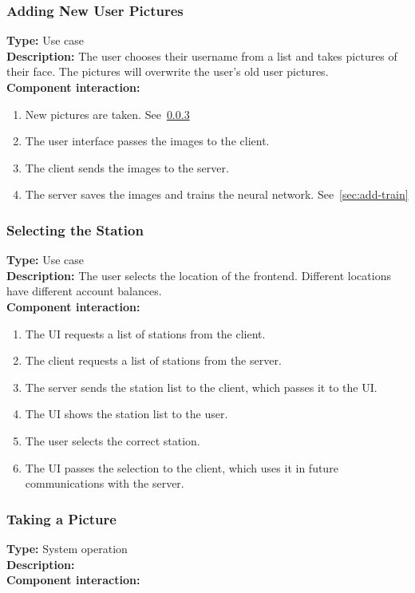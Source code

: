 \documentclass[11pt]{article}
\begin{document}
\subsubsection{Adding New User Pictures}
\textbf{Type:} Use case\\
\textbf{Description:} The user chooses their username from a list and takes pictures of their face. 
The pictures will overwrite the user's old user pictures.\\
\textbf{Component interaction:}
\begin{enumerate} 
\item{New pictures are taken. See~\ref{sec:pic}}
\item{The user interface passes the images to the client.}
\item{The client sends the images to the server.}
\item{The server saves the images and trains the neural network. See~\ref{sec:add-train}}
\end{enumerate}

\subsubsection{Selecting the Station}
\textbf{Type:} Use case\\
\textbf{Description:} The user selects the location of the frontend. Different locations
have different account balances.\\
\textbf{Component interaction:}\\
\begin{enumerate}
\item{The UI requests a list of stations from the client.}
\item{The client requests a list of stations from the server.}
\item{The server sends the station list to the client, which passes it to the UI.}
\item{The UI shows the station list to the user.}
\item{The user selects the correct station.}
\item{The UI passes the selection to the client, which uses it in future communications with
the server.}
\end{enumerate}

\subsubsection{Taking a Picture}
\label{sec:pic}
\textbf{Type:} System operation\\
\textbf{Description:} \\
\textbf{Component interaction:}\\
\end{document}
